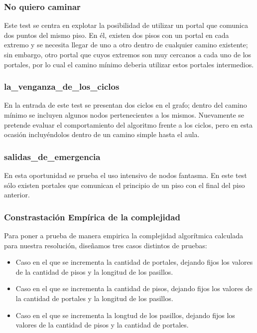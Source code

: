 \subsubsection{No quiero caminar}
Este test se centra en explotar la posibilidad de utilizar un portal que comunica dos puntos del mismo piso. En él, existen dos pisos con un portal en cada extremo y se necesita llegar de uno a otro dentro de cualquier camino existente; sin embargo, otro portal que cuyos extremos son muy cercanos a cada uno de los portales, por lo cual el camino mínimo deberia utilizar estos portales intermedios.

\subsubsection{la_venganza_de_los_ciclos}
En la entrada de este test se presentan dos ciclos en el grafo; dentro del camino mínimo se incluyen algunos nodos pertenecientes a los mismos. Nuevamente se pretende evaluar el comportamiento del algoritmo frente a los ciclos, pero en esta ocasión incluyéndolos dentro de un camino simple hasta el aula.

\subsubsection{salidas_de_emergencia}
En esta oportunidad se prueba el uso intensivo de nodos fantasma. En este test sólo existen portales que comunican el principio de un piso con el final del piso anterior.

\subsubsection{Constrastación Empírica de la complejidad}
Para poner a prueba de manera empirica la complejidad algorítmica calculada para nuestra resolución, diseñamos tres casos distintos de pruebas:
\begin{itemize}
\item{Caso en el que se incrementa la cantidad de portales, dejando fijos los valores de la cantidad de pisos y la longitud de los pasillos.}
\item{Caso en el que se incrementa la cantidad de pisos, dejando fijos los valores de la cantidad de portales y la longitud de los pasillos.}
\item{Caso en el que se incrementa la longtud de los pasillos, dejando fijos los valores de la cantidad de pisos y la cantidad de portales.}
\end{itemize}

